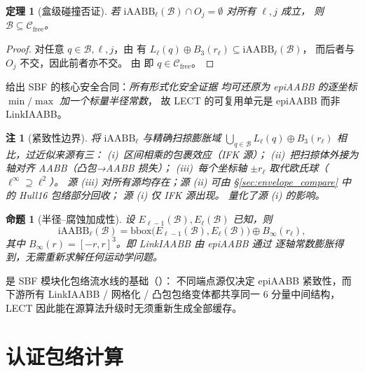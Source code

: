 \documentclass[journal]{IEEEtran}
\newtheorem{theorem}{定理}
\newtheorem{proposition}{命题}
\newtheorem{remark}{注}
\newcommand{\iAABB}{\mathrm{iAABB}}
\newcommand{\Cfree}{\mathcal{C}_{\mathrm{free}}}
\begin{document}
\begin{theorem}[盒级碰撞否证]\label{thm:certify}
若 $\iAABB_\ell(\mathcal{B})\cap O_j=\emptyset$ 对所有 $\ell,j$ 成立，
则 $\mathcal{B}\subseteq\Cfree$。
\end{theorem}

\begin{proof}
对任意 $q\in\mathcal{B},\ell,j$，由 
有 $L_\ell(q)\oplus B_3(r_\ell)\subseteq\iAABB_\ell(\mathcal{B})$，
而后者与 $O_j$ 不交，因此前者亦不交。
由  即 $q\in\Cfree$。
\end{proof}

 给出 SBF 的核心安全合同：\emph{所有形式化安全证据
均可还原为 epiAABB 的逐坐标 $\min/\max$ 加一个标量半径常数}，
故 LECT 的可复用单元是 epiAABB 而非 LinkIAABB。

\begin{remark}[紧致性边界]\label{rem:tightness}
将 $\iAABB_\ell$ 与精确扫掠膨胀域 $\bigcup_{q\in\mathcal{B}}
L_\ell(q)\oplus B_3(r_\ell)$ 相比，过近似来源有三：
(i)~区间相乘的\emph{包裹效应}（IFK 源）；
(ii)~把扫掠体外接为轴对齐 AABB（凸包→AABB 损失）；
(iii)~每个坐标轴 $\pm r_\ell$ 取代欧氏球（$\ell^\infty\!\supseteq\!\ell^2$）。
源 (iii) 对所有源均存在；源 (ii) 可由 §\ref{sec:envelope_compare} 中的 Hull16 包络部分回收；
源 (i) 仅 IFK 源出现。 量化了源 (i) 的影响。
\end{remark}

\begin{proposition}[半径--腐蚀加成性]\label{prop:radius_lift}
设 $E_{\ell-1}(\mathcal{B}),E_\ell(\mathcal{B})$ 已知，则
\begin{equation}
\iAABB_\ell(\mathcal{B})
=\mathrm{bbox}\bigl(E_{\ell-1}(\mathcal{B}),E_\ell(\mathcal{B})\bigr)
\oplus B_\infty(r_\ell),
\end{equation}
其中 $B_\infty(r)=[-r,r]^3$。即 LinkIAABB 由 epiAABB 通过
\emph{逐轴常数膨胀}得到，无需重新求解任何运动学问题。
\end{proposition}

 是 SBF 模块化包络流水线的基础（）：
不同端点源仅决定 epiAABB 紧致性，而下游所有
LinkIAABB / 网格化 / 凸包包络变体都共享同一 6 分量中间结构，
LECT 因此能在源算法升级时无须重新生成全部缓存。

\section{认证包络计算}\label{sec:envelope}
\end{document}
